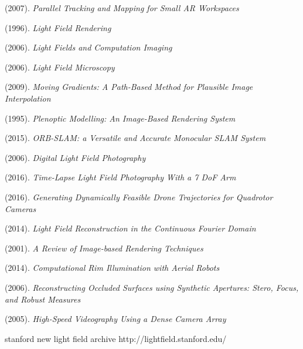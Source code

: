 \documentclass[12pt]{report}
\begin{document}
\begin{thebibliography}{10}
	(2007). \emph{Parallel Tracking and Mapping for Small AR Workspaces}	
	
	(1996). \emph{Light Field Rendering}
	
	(2006). \emph{Light Fields and Computation Imaging}

	(2006). \emph{Light Field Microscopy}
	
	(2009). \emph{Moving Gradients: A Path-Based Method for Plausible Image Interpolation}	
	
	(1995). \emph{Plenoptic Modelling: An Image-Based Rendering System}

	(2015). \emph{ORB-SLAM: a Versatile and Accurate Monocular SLAM System}

	(2006). \emph{Digital Light Field Photography}	

	(2016). \emph{Time-Lapse Light Field Photography With a 7 DoF Arm}

	(2016). \emph{Generating Dynamically Feasible Drone Trajectories for Quadrotor Cameras}

	(2014). \emph{Light Field Reconstruction in the Continuous Fourier Domain}

	(2001). \emph{A Review of Image-based Rendering Techniques}

	(2014). \emph{Computational Rim Illumination with Aerial Robots}

	(2006). \emph{Reconstructing Occluded Surfaces using Synthetic Apertures: Stero, Focus, and Robust Measures} 
	
	(2005). \emph{High-Speed Videography Using a Dense Camera Array}

stanford new light field archive http://lightfield.stanford.edu/

\end{thebibliography}
\end{document}
